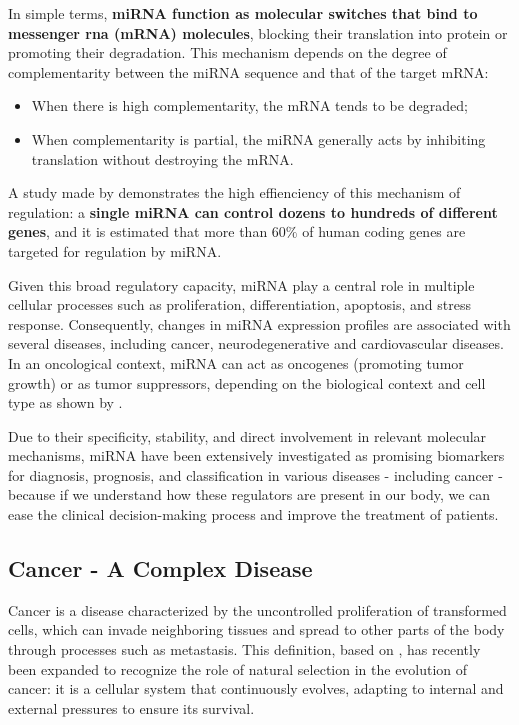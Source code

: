 In simple terms, \textbf{miRNA function as molecular switches that bind
  to messenger \gls{rna} (mRNA) molecules}, blocking their translation into
protein or promoting their degradation. This mechanism depends on the degree of
complementarity between the miRNA sequence and that of the target mRNA:

\begin{itemize}
  \item When there is high complementarity, the mRNA tends to be degraded;
  \item When complementarity is partial, the miRNA generally acts by inhibiting
        translation without destroying the mRNA.
\end{itemize}

A study made by \textcite{Gulyaeva2016Regulatory} demonstrates the high
effienciency of this mechanism of regulation: a \textbf{single miRNA can
  control dozens to hundreds of different genes}, and it is estimated that more
than $60\%$ of human coding genes are targeted for regulation by miRNA.

Given this broad regulatory capacity, miRNA play a central role in
multiple cellular processes such as proliferation, differentiation, apoptosis,
and stress response. Consequently, changes in miRNA expression profiles
are associated with several diseases, including cancer, neurodegenerative and
cardiovascular diseases. In an oncological context, miRNA can act as
oncogenes (promoting tumor growth) or as tumor suppressors, depending on the
biological context and cell type as shown by
\textcite{regulatory_mecha_mirnaGulyaeva2016}.

Due to their specificity, stability, and direct involvement in relevant
molecular mechanisms, miRNA have been extensively investigated as
promising biomarkers for diagnosis, prognosis, and classification in various
diseases - including cancer - because if we understand how these regulators are
present in our body, we can ease the clinical decision-making process and
improve the treatment of patients.

\subsection{Cancer - A Complex Disease}
Cancer is a disease characterized by the uncontrolled proliferation of
transformed cells, which can invade neighboring tissues and spread to other
parts of the body through processes such as metastasis. This definition, based
on \textcite{NCI2021,def_of_cancer_Brown2023}, has recently been expanded to
recognize the role of natural selection in the evolution of cancer: it is a
cellular system that continuously evolves, adapting to internal and external
pressures to ensure its survival.

